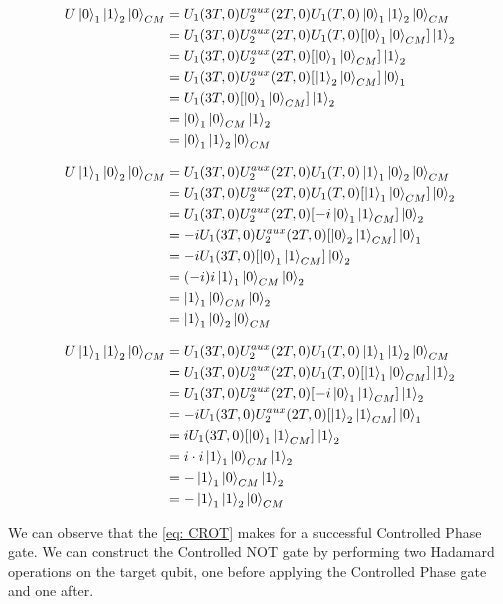 \documentclass[../main.tex]{subfiles}
\begin{document}
\begin{equation}
    \begin{split}
        U\ket{0}_1\ket{1}_2\ket{0}_{CM} &=  U_1(3T,0)U_2^{aux}(2T,0)U_1(T,0)\ket{0}_1\ket{1}_2\ket{0}_{CM}\\
        &= U_1(3T,0)U_2^{aux}(2T,0)U_1(T,0)[\ket{0}_1\ket{0}_{CM}]\ket{1}_2\\
        &= U_1(3T,0)U_2^{aux}(2T,0)[\ket{0}_1\ket{0}_{CM}]\ket{1}_2\\
        &= U_1(3T,0)U_2^{aux}(2T,0)[\ket{1}_2\ket{0}_{CM}]\ket{0}_1\\
        &= U_1(3T,0)[\ket{0}_1\ket{0}_{CM}]\ket{1}_2\\
        &= \ket{0}_1\ket{0}_{CM}\ket{1}_2\\
        &= \ket{0}_1\ket{1}_2\ket{0}_{CM}
    \end{split}
\end{equation}

\begin{equation}
    \begin{split}
        U\ket{1}_1\ket{0}_2\ket{0}_{CM} &=  U_1(3T,0)U_2^{aux}(2T,0)U_1(T,0)\ket{1}_1\ket{0}_2\ket{0}_{CM}\\
        &= U_1(3T,0)U_2^{aux}(2T,0)U_1(T,0)[\ket{1}_1\ket{0}_{CM}]\ket{0}_2\\
        &= U_1(3T,0)U_2^{aux}(2T,0)[-i\ket{0}_1\ket{1}_{CM}]\ket{0}_2\\
        &= -iU_1(3T,0)U_2^{aux}(2T,0)[\ket{0}_2\ket{1}_{CM}]\ket{0}_1\\
        &= -iU_1(3T,0)[\ket{0}_1\ket{1}_{CM}]\ket{0}_2\\
        &= (-i)i\ket{1}_1\ket{0}_{CM}\ket{0}_2\\
        &= \ket{1}_1\ket{0}_{CM}\ket{0}_2\\
        &= \ket{1}_1\ket{0}_2\ket{0}_{CM}
    \end{split}
\end{equation}

\begin{equation}
    \begin{split}
        U\ket{1}_1\ket{1}_2\ket{0}_{CM} &=  U_1(3T,0)U_2^{aux}(2T,0)U_1(T,0)\ket{1}_1\ket{1}_2\ket{0}_{CM}\\
        &= U_1(3T,0)U_2^{aux}(2T,0)U_1(T,0)[\ket{1}_1\ket{0}_{CM}]\ket{1}_2\\
        &= U_1(3T,0)U_2^{aux}(2T,0)[-i\ket{0}_1\ket{1}_{CM}]\ket{1}_2\\
        &= -iU_1(3T,0)U_2^{aux}(2T,0)[\ket{1}_2\ket{1}_{CM}]\ket{0}_1\\
        &= iU_1(3T,0)[\ket{0}_1\ket{1}_{CM}]\ket{1}_2\\
        &= i\cdot i\ket{1}_1\ket{0}_{CM}\ket{1}_2\\
        &= -\ket{1}_1\ket{0}_{CM}\ket{1}_2\\
        &= -\ket{1}_1\ket{1}_2\ket{0}_{CM}
    \end{split}
\end{equation}

\noindent We can observe that the \cref{eq: CROT} makes for a successful Controlled Phase gate. We can construct the Controlled NOT gate by performing two Hadamard operations on the target qubit, one before applying the Controlled Phase gate and one after. 
\end{document}
